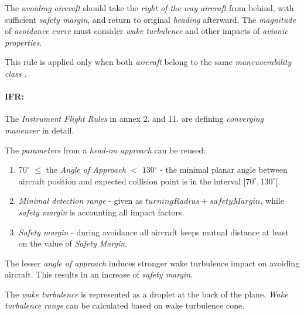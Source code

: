 The \emph{avoiding aircraft} should take the \emph{right of the way aircraft} from behind, with sufficient \emph{safety margin}, and return to original \emph{heading} afterward. The \emph{magnitude} of \emph{avoidance curve} must consider \emph{wake turbulence} and other impacts of \emph{avionic properties}.

\begin{note}
    This rule is applied only when both \emph{aircraft} belong to the same  \emph{maneuverability class} \cite{icaoAnnex2}.
\end{note}

\paragraph{IFR:} The \emph{Instrument Flight Rules} in annex 2. \cite{icaoAnnex2} and 11. \cite{icaoAnnex11} are defining \emph{converging maneuver} in detail.

The \emph{parameters} from a \emph{head-on approach} can be reused:
\begin{enumerate}
    \item $70^\circ$ $\le$ the \emph{Angle of Approach} $<$ $130^\circ$ - the minimal planar angle between aircraft position and expected collision point is in the interval $[70^\circ , 130^\circ[$.
    
    \item\emph{Minimal detection range} - given as $turning Radius + safety Margin$, while \emph{safety margin} is accounting all impact factors. 
    
    \item\emph{Safety margin} - during avoidance all aircraft keeps mutual distance at least on the value of \emph{Safety Margin}.
\end{enumerate}

\begin{note}
The lesser \emph{angle of approach} induces stronger wake turbulence impact on avoiding aircraft. This results in an increase of \emph{safety margin}. 

The \emph{wake turbulence} is represented as a droplet at the back of the plane. \emph{Wake turbulence range} can be calculated based on wake turbulence cone.
\end{note}


